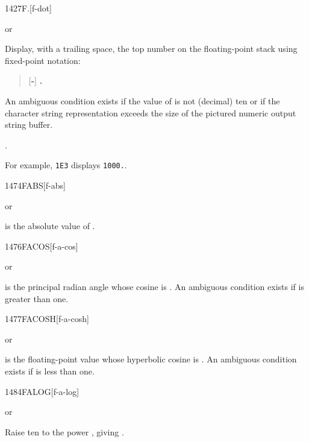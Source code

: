\begin{worddef}{1427}{F.}[f-dot]
\item \stack{}{}  or

	Display, with a trailing space, the top number on the
	floating-point stack using fixed-point notation:
	\begin{quote}
		[\textbf{-}] \textbf{.}
	\end{quote}
	An ambiguous condition exists if the value of 
	is not (decimal) ten or if the character string representation
	exceeds the size of the pictured numeric output string buffer.

\see {}.

	\begin{rationale} %
		For example, \texttt{1E3}  displays \texttt{1000.}.
	\end{rationale}
\end{worddef}


\begin{worddef}{1474}{FABS}[f-abs]
\item {} or

	 is the absolute value of .
\end{worddef}


\begin{worddef}{1476}{FACOS}[f-a-cos]
\item {} or

	 is the principal radian angle whose cosine is
	. An ambiguous condition exists if  is
	greater than one.
\end{worddef}


\begin{worddef}{1477}{FACOSH}[f-a-cosh]
\item {} or

	 is the floating-point value whose hyperbolic cosine is
	. An ambiguous condition exists if  is less
	than one.
\end{worddef}


\begin{worddef}{1484}{FALOG}[f-a-log]
\item {} or

	Raise ten to the power , giving .
\end{worddef}


